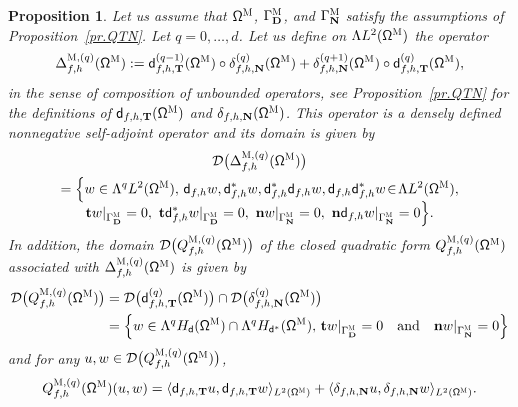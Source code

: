 \documentclass[10pt]{amsart}
\newcommand{\quand}{\quad\text{and}\quad}
\newcommand{\mbf}[1]{\mathbf{#1}}
\theoremstyle{plain}
\newtheorem{proposition}{Proposition}
\theoremstyle{definition}
\begin{document}
\begin{proposition}
\label{pr.DeltaM}
Let us assume that $\mathsf \Omega^{\textsc{M}}$, $\Gamma^{\textsc{M}}_{\mbf D}$, and $\Gamma^{\textsc{M}}_{\mbf N}$ satisfy the assumptions of Proposition~\ref{pr.QTN}. Let $q=0,\ldots,d$. Let us define on $ \Lambda L^{2} (\mathsf \Omega^{\textsc{M}})$ the operator
\begin{equation}
\label{eq.DeltaTN}
\Delta_{f,h}^{\textsc{M},(q)} (\mathsf \Omega^{\textsc{M}}):= \mathsf d_{f,h,\mbf T}^{(q-1)} (\mathsf \Omega^{\textsc{M}})\circ \delta_{f,h,\mbf N}^{(q)} (\mathsf \Omega^{\textsc{M}})+\delta_{f,h,\mbf N}^{(q+1)} (\mathsf \Omega^{\textsc{M}})\circ \mathsf d_{f,h,\mbf T}^{(q)} (\mathsf \Omega^{\textsc{M}}),
\end{equation}
in the sense of composition of unbounded operators, see Proposition~\ref{pr.QTN} for the definitions of $\mathsf d_{f,h,\mbf T} (\mathsf \Omega^{\textsc{M}})$ and $\delta_{f,h,\mbf N} (\mathsf \Omega^{\textsc{M}})$. This operator is a densely defined nonnegative self-adjoint operator
and its domain is given by
\begin{multline}
\label{eq.domDeltaTN}
\mathcal D\bigl(\Delta_{f,h}^{\textsc{M},(q)} (\mathsf \Omega^{\textsc{M}})\bigr)\\
=\Big\{w \in \Lambda^qL^{2}
(\mathsf \Omega^{\textsc{M}}), \,
\mathsf d_{f,h} w, \mathsf d^*_{f,h}w, \mathsf d^*_{f,h}\mathsf
d_{f,h} w, \mathsf d_{f,h}\mathsf d^*_{f,h} w \!
\in \! \Lambda L^{2} (\mathsf \Omega^{\textsc{M}}), \\[-5pt]
\mathbf{t}w|_{\Gamma^{\textsc{M}}_{\mbf D}}=0,\
\mathbf{t}\mathsf d^*_{f,h}w|_{\Gamma^{\textsc{M}}_{\mbf D}}=0,\
\mathbf{n}w|_{\Gamma^{\textsc{M}}_{\mbf N}}=0,\
\mathbf{n}\mathsf d_{f,h}w|_{\Gamma^{\textsc{M}}_{\mbf N}}=0
\Big\}.
\end{multline}
In addition, the domain $\mathcal D\bigl(Q_{f,h}^{\textsc{M},(q)} (\mathsf \Omega^{\textsc{M}}) \bigr)$ of the closed quadratic form $Q_{f,h}^{\textsc{M},(q)} (\mathsf \Omega^{\textsc{M}})$
associated with $\Delta_{f,h}^{\textsc{M},(q)} (\mathsf \Omega^{\textsc{M}})$
is given by
\begin{align*}
\mathcal D\bigl(Q^{\textsc{M},(q)}_{f,h} (\mathsf \Omega
^{\textsc{M}})\bigr)&= \mathcal D \bigl(\mathsf d_{f,h,\mbf T}^{(q)} (\mathsf \Omega^{\textsc{M}})\bigr)\cap
\mathcal D\bigl(\delta_{f,h,\mbf N}^{(q)} (\mathsf \Omega^{\textsc{M}})\bigr)\\
&=\left\{w\in \Lambda^qH_{\mathsf d}(\mathsf \Omega^{\textsc{M}})\cap \Lambda^qH_{\mathsf d^*}(\mathsf \Omega^{\textsc{M}}),\,
\mathbf t w|_{\Gamma^{\textsc{M}}_{\mbf D}}=0 \quand 
\mathbf n w|_{\Gamma^{\textsc{M}}_{\mbf N}}=0\right\}
\end{align*}
\label{page.qm}
and for any $u,w\in\mathcal D\bigl(Q^{\textsc{M},(q)}_{f,h} (\mathsf \Omega^{\textsc{M}})\bigr)$,
\[
Q_{f,h}^{\textsc{M},(q)} (\mathsf \Omega^{\textsc{M}})(u,w)=\langle \mathsf d_{f,h,\mbf T} u,\mathsf d_{f,h,\mbf T}w \rangle_{L^2(\mathsf \Omega^{\textsc{M}})} +\langle \delta_{f,h,\mbf N}u,\delta_{f,h,\mbf N}w \rangle_{L^2(\mathsf \Omega^{\textsc{M}})}.
\]
\end{proposition}
\end{document}
